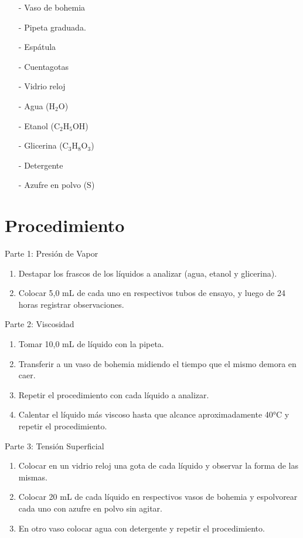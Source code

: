 \documentclass{article}
\begin{document}
\begin{itemize}

    \item[-]Vaso de bohemia
    \item[-]Pipeta graduada.
    \item[-]Espátula
    \item[-]Cuentagotas
    \item[-]Vidrio reloj
    \item[-]Agua ($\text{H}_{\text{2}}\text{O}$)
    \item[-]Etanol ($\text{C}_{\text{2}}\text{H}_{\text{5}}\text{OH}$)
    \item[-]Glicerina ($\text{C}_{\text{3}}\text{H}_{\text{8}}\text{O}_{\text{3}}$)
    \item[-]Detergente
    \item[-]Azufre en polvo (S)
    
\end{itemize}

\newpage

\section{Procedimiento}

Parte 1: Presión de Vapor

\begin{enumerate}
    \item Destapar los frascos de los líquidos a analizar (agua, etanol y glicerina).
    \item Colocar 5,0 mL de cada uno en respectivos tubos de ensayo, y luego de 24 horas registrar observaciones.
\end{enumerate}

Parte 2: Viscosidad

\begin{enumerate}
    \item Tomar 10,0 mL de líquido con la pipeta.
    \item Transferir a un vaso de bohemia midiendo el tiempo que el mismo demora en caer.
    \item Repetir el procedimiento con cada líquido a analizar.
    \item Calentar el líquido más viscoso hasta que alcance aproximadamente 40°C y repetir el procedimiento.
\end{enumerate}

Parte 3: Tensión Superficial

\begin{enumerate}
    \item Colocar en un vidrio reloj una gota de cada líquido y observar la forma de las mismas.
    \item Colocar 20 mL de cada líquido en respectivos vasos de bohemia y espolvorear cada uno con azufre en polvo sin agitar.
    \item En otro vaso colocar agua con detergente y repetir el procedimiento.
\end{enumerate}
\end{document}
